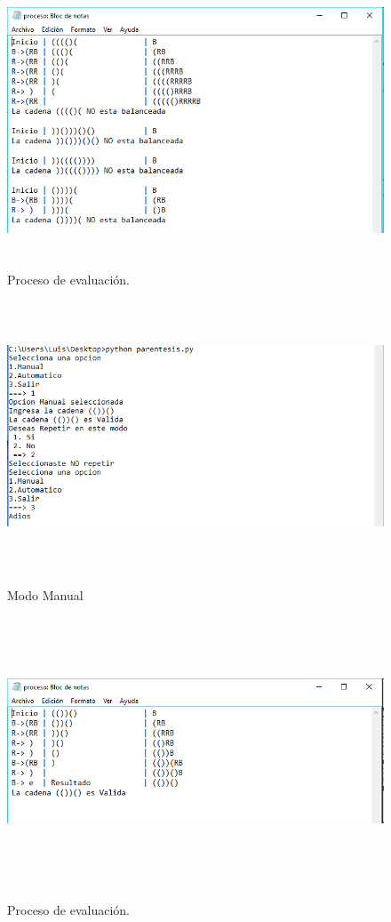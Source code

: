 \documentclass[12pt]{article}
\begin{document}
\begin{figure}[H]
\begin{center}
\includegraphics[width=\textwidth, height=8cm]{auto_parentesis_proceso}
\label{ }
\caption{Proceso de evaluación.}
\end{center}
\end{figure}

\begin{figure}[H]
\begin{center}
\includegraphics[width=\textwidth, height=8cm]{manual_parentesis}
\label{ }
\caption{Modo Manual}
\end{center}
\end{figure}

\begin{figure}[H]
\begin{center}
\includegraphics[width=\textwidth, height=8cm]{manual_parentesis_proceso}
\label{ }
\caption{Proceso de evaluación.}
\end{center}
\end{figure}
\end{document}
